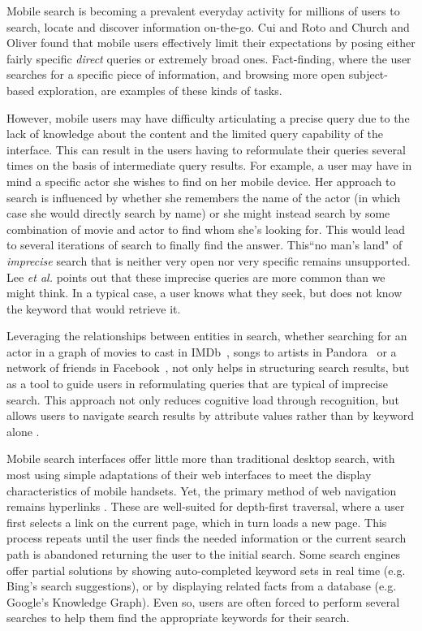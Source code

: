 Mobile search is becoming a prevalent everyday activity for millions of users to search, locate and discover information on-the-go.  Cui and Roto \cite{Cui:2008} and Church and Oliver \cite{Church:2011} found that mobile users effectively limit their expectations by posing either fairly specific \textit{direct} queries or extremely broad ones. Fact-finding, where the user searches for a specific piece of information, and browsing more open subject-based exploration, are examples of these kinds of tasks. 

However, mobile users may have difficulty articulating a precise query due to the lack of knowledge about the content and the limited query capability of the interface. This can result in the users having to reformulate their queries several times on the basis of intermediate query results. For example, a user may have in mind a specific actor she
wishes to find on her mobile device. Her approach to search is influenced by whether she remembers the name of the actor
(in which case she would directly search by name) or she might instead search by some combination of movie and actor to find whom she's looking for.  This would lead to several iterations of search to finally find the answer. This``no man's land" of \textit{imprecise} search that is neither very open nor very specific remains unsupported. Lee \textit{et al.} \cite{Lee:2012} points out that these imprecise queries are more common than we might think. In a typical case, a user knows what they seek, but does not know the keyword that would retrieve it.

Leveraging the relationships between entities in search, whether searching for an actor in a graph of movies to cast in IMDb~\cite{imdb}, songs to artists in Pandora~\cite{pandora} or a network of friends in Facebook~\cite{Facebook}, not only helps in structuring search results, but as a tool to guide users in reformulating queries that are typical of imprecise search. This approach not only reduces cognitive load through recognition, but allows users to navigate search results by attribute values rather than by keyword alone \cite{Hearst:2002}.

Mobile search interfaces offer little more than traditional desktop search, with most using simple adaptations of their web interfaces to meet the display characteristics of
mobile handsets. Yet, the primary method of web navigation remains hyperlinks \cite{206540}.  These are well-suited for depth-first traversal, where a user first selects a link on the current page, which in turn loads a new page. This process repeats until the user finds the needed information or the current search path is abandoned returning the user to the initial search. Some search engines offer partial solutions by showing auto-completed keyword sets in real time (e.g. Bing's search suggestions), or by displaying related facts from a database (e.g. Google's Knowledge Graph). Even so, users are often forced to perform several searches to help them find the appropriate keywords for their search.


